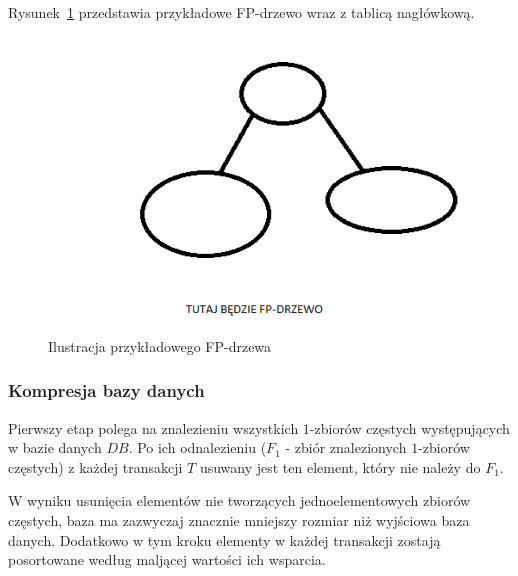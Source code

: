 Rysunek~\ref{rys:fptree} przedstawia przykładowe FP-drzewo wraz z tablicą nagłówkową.

\begin{figure}[h]
\centering\includegraphics{figures/fptree.png}
\caption{Ilustracja przykładowego FP-drzewa}\label{rys:fptree}
\end{figure}

\subsubsection{Kompresja bazy danych}
Pierwszy etap polega na znalezieniu wszystkich $1$-zbiorów częstych występujących w bazie danych $DB$. Po ich odnalezieniu ($F_1$ - zbiór znalezionych $1$-zbiorów częstych) z każdej transakcji $T$ usuwany jest ten element, który nie należy do $F_1$. 

W wyniku usunięcia elementów nie tworzących jednoelementowych zbiorów częstych, baza ma zazwyczaj znacznie mniejszy rozmiar niż wyjściowa baza danych. Dodatkowo w tym kroku elementy w każdej transakcji zostają posortowane według maljącej wartości ich wsparcia.


